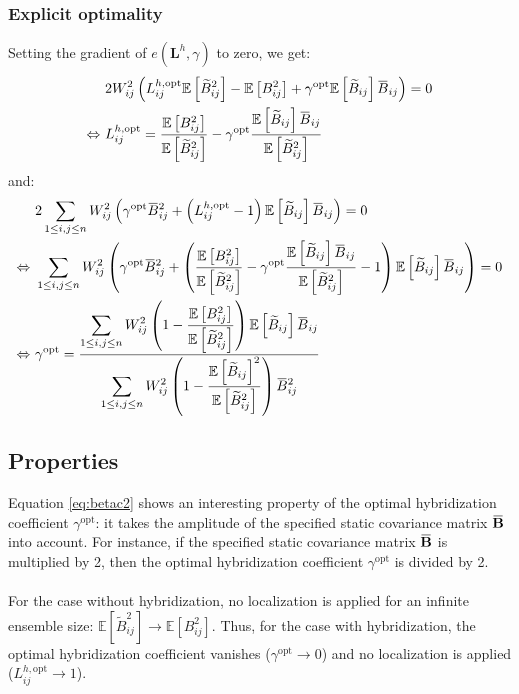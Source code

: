 \documentclass[12pt]{scrartcl}
\newcommand{\overbar}[1]{\mkern 1.5mu\overline{\mkern-1.5mu#1\mkern-1.5mu}\mkern 1.5mu}
\begin{document}
\subsubsection{Explicit optimality}
Setting the gradient of $e(\mathbf{L}^h,\gamma)$ to zero, we get:
\begin{align}
\label{eq:hyb_th}
& 2 W_{ij}^2 \left(L^{h,\mathrm{opt}}_{ij} \mathbb{E} \left[\widetilde{B}_{ij}^2\right] - \mathbb{E} \left[B^2_{ij}\right] + \gamma^\mathrm{opt} \mathbb{E} \left[\widetilde{B}_{ij}\right] \overbar{B}_{ij} \right) = 0 \nonumber \\
\Leftrightarrow \ & L^{h,\mathrm{opt}}_{ij} = \frac{\mathbb{E} \left[B^2_{ij}\right]}{\mathbb{E} \left[\widetilde{B}_{ij}^2\right]} - \gamma^\mathrm{opt} \frac{\mathbb{E} \left[\widetilde{B}_{ij}\right] \overbar{B}_{ij}}{\mathbb{E} \left[\widetilde{B}_{ij}^2\right]}
\end{align}
and:
\begin{align}
\label{eq:betac2}
& 2 \sum_{1 \le i,j \le n} W_{ij}^2 \left(\gamma^\mathrm{opt} \overbar{B}_{ij}^2 + \left(L^{h,\mathrm{opt}}_{ij} - 1\right) \mathbb{E} \left[\widetilde{B}_{ij}\right] \overbar{B}_{ij} \right) = 0 \nonumber \\
\Leftrightarrow \ & \sum_{1 \le i,j \le n} W_{ij}^2 \left(\gamma^\mathrm{opt} \overbar{B}_{ij}^2 + \left(\frac{\mathbb{E} \left[B^2_{ij}\right]}{\mathbb{E} \left[\widetilde{B}_{ij}^2\right]} - \gamma^\mathrm{opt} \frac{\mathbb{E} \left[\widetilde{B}_{ij}\right] \overbar{B}_{ij}}{\mathbb{E} \left[\widetilde{B}_{ij}^2\right]} - 1\right) \mathbb{E} \left[\widetilde{B}_{ij}\right] \overbar{B}_{ij} \right) = 0 \nonumber \\
\Leftrightarrow \ & \gamma^\mathrm{opt} = \frac{\displaystyle \sum_{1 \le i,j \le n} W_{ij}^2 \left(1 - \frac{\mathbb{E} \left[B^2_{ij}\right]}{\mathbb{E} \left[\widetilde{B}_{ij}^2\right]}\right) \mathbb{E}\left[ \widetilde{B}_{ij}\right] \overbar{B}_{ij}}{\displaystyle \sum_{1 \le i,j \le n} W_{ij}^2 \left(1 - \frac{\mathbb{E} \left[\widetilde{B}_{ij}\right]^2}{\mathbb{E}\left[ \widetilde{B}_{ij}^2 \right]}\right) \overbar{B}_{ij}^2}
\end{align}

\subsection{Properties}
Equation \eqref{eq:betac2} shows an interesting property of the optimal hybridization coefficient $\gamma^\mathrm{opt}$: it takes the amplitude of the specified static covariance matrix $\overbar{\mathbf{B}}$ into account. For instance, if the specified static covariance matrix  $\overbar{\mathbf{B}}$ is multiplied by 2, then the optimal hybridization coefficient $\gamma^\mathrm{opt}$ is divided by 2.\\
$  $\\
For the case without hybridization, no localization is applied for an infinite ensemble size: $\mathbb{E} \left[\widetilde{B}_{ij}^2\right] \rightarrow \mathbb{E} \left[B^2_{ij}\right]$. Thus, for the case with hybridization, the optimal hybridization coefficient vanishes ($\gamma^\mathrm{opt} \rightarrow 0$) and no localization is applied ($L^{h,\mathrm{opt}}_{ij} \rightarrow 1$).
\end{document}

